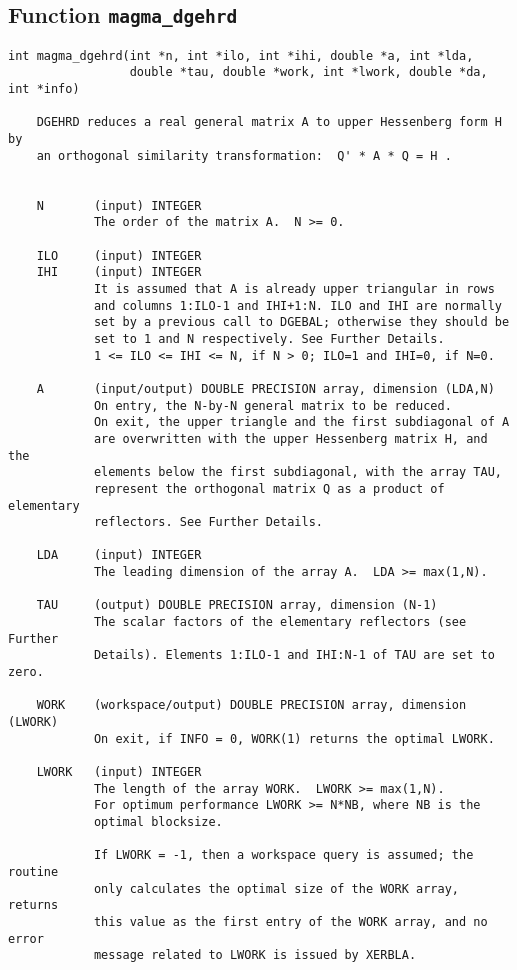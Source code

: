\documentclass[10pt]{book}
\begin{document}
\subsection{Function {\tt {\bf magma\_dgehrd}}}
\begin{verbatim}
int magma_dgehrd(int *n, int *ilo, int *ihi, double *a, int *lda,
                 double *tau, double *work, int *lwork, double *da, int *info)

    DGEHRD reduces a real general matrix A to upper Hessenberg form H by
    an orthogonal similarity transformation:  Q' * A * Q = H .


    N       (input) INTEGER
            The order of the matrix A.  N >= 0.

    ILO     (input) INTEGER
    IHI     (input) INTEGER
            It is assumed that A is already upper triangular in rows
            and columns 1:ILO-1 and IHI+1:N. ILO and IHI are normally
            set by a previous call to DGEBAL; otherwise they should be
            set to 1 and N respectively. See Further Details.
            1 <= ILO <= IHI <= N, if N > 0; ILO=1 and IHI=0, if N=0.

    A       (input/output) DOUBLE PRECISION array, dimension (LDA,N)
            On entry, the N-by-N general matrix to be reduced.
            On exit, the upper triangle and the first subdiagonal of A
            are overwritten with the upper Hessenberg matrix H, and the
            elements below the first subdiagonal, with the array TAU,
            represent the orthogonal matrix Q as a product of elementary
            reflectors. See Further Details.

    LDA     (input) INTEGER
            The leading dimension of the array A.  LDA >= max(1,N).

    TAU     (output) DOUBLE PRECISION array, dimension (N-1)
            The scalar factors of the elementary reflectors (see Further
            Details). Elements 1:ILO-1 and IHI:N-1 of TAU are set to zero.

    WORK    (workspace/output) DOUBLE PRECISION array, dimension (LWORK)
            On exit, if INFO = 0, WORK(1) returns the optimal LWORK.

    LWORK   (input) INTEGER
            The length of the array WORK.  LWORK >= max(1,N).
            For optimum performance LWORK >= N*NB, where NB is the
            optimal blocksize.

            If LWORK = -1, then a workspace query is assumed; the routine
            only calculates the optimal size of the WORK array, returns
            this value as the first entry of the WORK array, and no error
            message related to LWORK is issued by XERBLA.


\end{verbatim}
\end{document}
